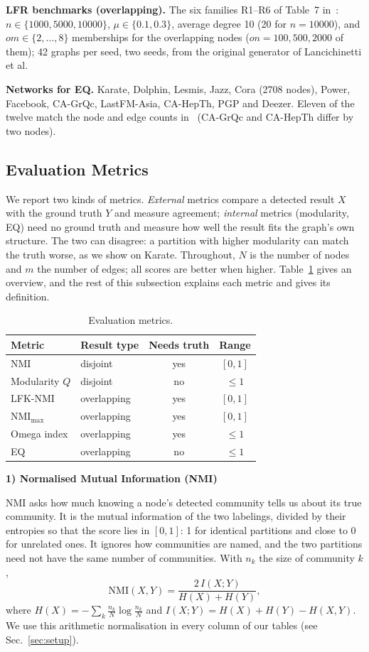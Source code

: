 \documentclass[conference]{IEEEtran}
\newcommand{\metrichead}[1]{\par\smallskip\noindent\textbf{#1}\par\nobreak\vspace{1pt}}
\begin{document}
\textbf{LFR benchmarks (overlapping).} The six families R1--R6 of Table~7 in~\cite{kong2026}: $n\in\{1000,5000,10000\}$, $\mu\in\{0.1,0.3\}$, average degree 10 (20 for $n=10000$), and $om\in\{2,\dots,8\}$ memberships for the overlapping nodes ($on=100,500,2000$ of them); 42 graphs per seed, two seeds, from the original generator of Lancichinetti et al.

\textbf{Networks for EQ.} Karate, Dolphin, Lesmis, Jazz, Cora (2708 nodes), Power, Facebook, CA-GrQc, LastFM-Asia, CA-HepTh, PGP and Deezer. Eleven of the twelve match the node and edge counts in~\cite{kong2026} (CA-GrQc and CA-HepTh differ by two nodes).

\subsection{Evaluation Metrics}\label{sec:metrics}
We report two kinds of metrics. \emph{External} metrics compare a detected result $X$ with the ground truth $Y$ and measure agreement; \emph{internal} metrics (modularity, EQ) need no ground truth and measure how well the result fits the graph's own structure. The two can disagree: a partition with higher modularity can match the truth worse, as we show on Karate. Throughout, $N$ is the number of nodes and $m$ the number of edges; all scores are better when higher. Table~\ref{tab:metrics} gives an overview, and the rest of this subsection explains each metric and gives its definition.
\begin{table}[H]
\centering
\caption{Evaluation metrics.}
\label{tab:metrics}
\scriptsize
\setlength{\tabcolsep}{3pt}
\begin{tabular}{llcc}
\toprule
Metric & Result type & Needs truth & Range \\
\midrule
NMI & disjoint & yes & $[0,1]$ \\
Modularity $Q$ & disjoint & no & $\le 1$ \\
LFK-NMI & overlapping & yes & $[0,1]$ \\
$\mathrm{NMI}_{\max}$ & overlapping & yes & $[0,1]$ \\
Omega index & overlapping & yes & $\le 1$ \\
EQ & overlapping & no & $\le 1$ \\
\bottomrule
\end{tabular}
\end{table}

\metrichead{1) Normalised Mutual Information (NMI)}
NMI asks how much knowing a node's detected community tells us about its true community. It is the mutual information of the two labelings, divided by their entropies so that the score lies in $[0,1]$: 1 for identical partitions and close to 0 for unrelated ones. It ignores how communities are named, and the two partitions need not have the same number of communities. With $n_k$ the size of community $k$,
\begin{equation}
\mathrm{NMI}(X,Y)=\frac{2\,I(X;Y)}{H(X)+H(Y)},\label{eq:nmi}
\end{equation}
where $H(X)=-\sum_k\frac{n_k}{N}\log\frac{n_k}{N}$ and $I(X;Y)=H(X)+H(Y)-H(X,Y)$. We use this arithmetic normalisation in every column of our tables (see Sec.~\ref{sec:setup}).
\end{document}
